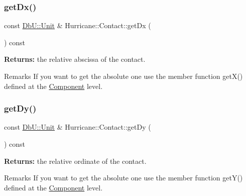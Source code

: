 \subsubsection{\texorpdfstring{get\+Dx()}{getDx()}}
{\footnotesize\ttfamily const \mbox{\hyperlink{group__DbUGroup_ga4fbfa3e8c89347af76c9628ea06c4146}{Db\+U\+::\+Unit}} \& Hurricane\+::\+Contact\+::get\+Dx (\begin{DoxyParamCaption}{ }\end{DoxyParamCaption}) const\hspace{0.3cm}{\ttfamily [inline]}}

{\bfseries Returns\+:} the relative abscissa of the contact.

\begin{DoxyRemark}{Remarks}
If you want to get the absolute one use the member function get\+X() defined at the \mbox{\hyperlink{classHurricane_1_1Component}{Component}} level. 
\end{DoxyRemark}
\mbox{\label{classHurricane_1_1Contact_aa7bc32ab9211fd5f6ad3aacdf1214f20}} 
\subsubsection{\texorpdfstring{get\+Dy()}{getDy()}}
{\footnotesize\ttfamily const \mbox{\hyperlink{group__DbUGroup_ga4fbfa3e8c89347af76c9628ea06c4146}{Db\+U\+::\+Unit}} \& Hurricane\+::\+Contact\+::get\+Dy (\begin{DoxyParamCaption}{ }\end{DoxyParamCaption}) const\hspace{0.3cm}{\ttfamily [inline]}}

{\bfseries Returns\+:} the relative ordinate of the contact.

\begin{DoxyRemark}{Remarks}
If you want to get the absolute one use the member function get\+Y() defined at the \mbox{\hyperlink{classHurricane_1_1Component}{Component}} level. 
\end{DoxyRemark}
\mbox{\label{classHurricane_1_1Contact_a28bd18de9ca6e5cf2b77fce5e22af43a}} 
